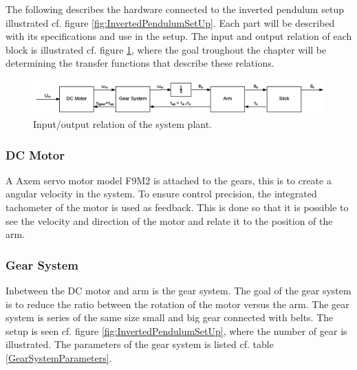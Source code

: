 The following describes the hardware connected to the inverted pendulum setup illustrated cf. figure \ref{fig:InvertedPendulumSetUp}.
Each part will be described with its specifications and use in the setup. The input and output relation of each block is illustrated cf. figure \ref{fig:DCMotorRelation}, where the goal troughout the chapter will be determining the transfer functions that describe these relations.

\begin{figure} [htbp]
\hspace*{-3.5cm}  
	\centering
	\includegraphics[width=0.95\paperwidth]{figures/modeling/InputOutputSystem.png}
	\caption{Input/output relation of the system plant.} \label{fig:DCMotorRelation}
\end{figure}

\startexplain
\stopexplain

\subsubsection{DC Motor}
A Axem servo motor model F9M2 is attached to the gears, this is to create a angular velocity in the system. To ensure control precision, the integrated tachometer of the motor is used as feedback. This is done so that it is possible to see the velocity and direction of the motor and relate it to the position of the arm.

	

\subsubsection{Gear System}
Inbetween the DC motor and arm is the gear system. The goal of the gear system is to reduce the ratio between the rotation of the motor versus the arm. The gear system is series of the same size small and big gear connected with belts. The setup is seen cf. figure \ref{fig:InvertedPendulumSetUp}, where the number of gear is illustrated. The parameters of the gear system is listed cf. table \ref{GearSystemParameters}.   

